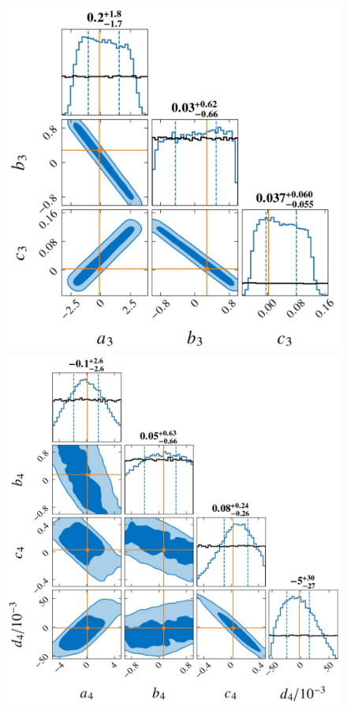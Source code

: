 \documentclass[a4paper,11pt]{article}
\begin{document}
\begin{figure}
    \begin{minipage}[t]{0.49\textwidth}
    \centering
    \includegraphics[width=0.8\linewidth]{Hyper_parameter_3d.pdf}
    \end{minipage}
    \hfill
    \begin{minipage}[t]{0.49\textwidth}
    \centering
    \includegraphics[width=0.8\linewidth]{Hyper_parameter_4d.pdf}
    \end{minipage}
    \vspace{3mm}

\end{figure}
\end{document}
